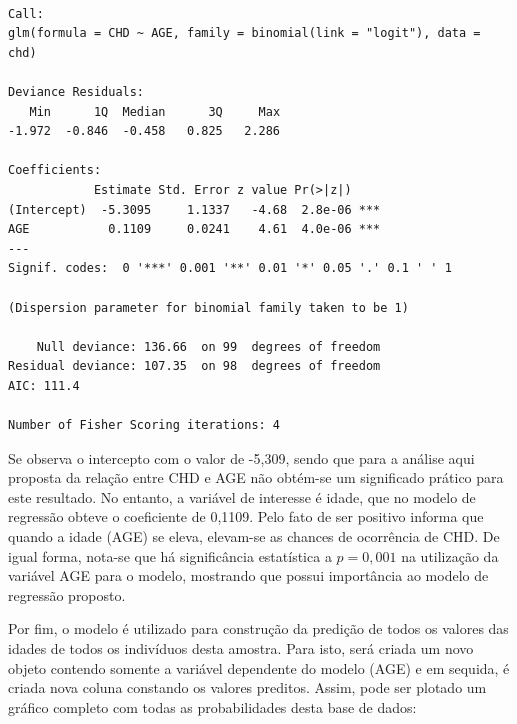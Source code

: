 \documentclass[12pt,brazil,oneside]{book}
\newenvironment{Shaded}{\begin{snugshade}}{\end{snugshade}}
\newcommand{\CommentTok}[1]{\textcolor[rgb]{0.56,0.35,0.01}{\textit{#1}}}
\newcommand{\DataTypeTok}[1]{\textcolor[rgb]{0.13,0.29,0.53}{#1}}
\newcommand{\DecValTok}[1]{\textcolor[rgb]{0.00,0.00,0.81}{#1}}
\newcommand{\KeywordTok}[1]{\textcolor[rgb]{0.13,0.29,0.53}{\textbf{#1}}}
\newcommand{\NormalTok}[1]{#1}
\newcommand{\OperatorTok}[1]{\textcolor[rgb]{0.81,0.36,0.00}{\textbf{#1}}}
\newcommand{\StringTok}[1]{\textcolor[rgb]{0.31,0.60,0.02}{#1}}
\begin{document}
\begin{verbatim}

Call:
glm(formula = CHD ~ AGE, family = binomial(link = "logit"), data = chd)

Deviance Residuals: 
   Min      1Q  Median      3Q     Max  
-1.972  -0.846  -0.458   0.825   2.286  

Coefficients:
            Estimate Std. Error z value Pr(>|z|)    
(Intercept)  -5.3095     1.1337   -4.68  2.8e-06 ***
AGE           0.1109     0.0241    4.61  4.0e-06 ***
---
Signif. codes:  0 '***' 0.001 '**' 0.01 '*' 0.05 '.' 0.1 ' ' 1

(Dispersion parameter for binomial family taken to be 1)

    Null deviance: 136.66  on 99  degrees of freedom
Residual deviance: 107.35  on 98  degrees of freedom
AIC: 111.4

Number of Fisher Scoring iterations: 4
\end{verbatim}

Se observa o intercepto com o valor de -5,309, sendo que para a análise aqui proposta da relação entre CHD e AGE não obtém-se um significado prático para este resultado. No entanto, a variável de interesse é idade, que no modelo de regressão obteve o coeficiente de 0,1109. Pelo fato de ser positivo informa que quando a idade (AGE) se eleva, elevam-se as chances de ocorrência de CHD. De igual forma, nota-se que há significância estatística a \(p=0,001\) na utilização da variável AGE para o modelo, mostrando que possui importância ao modelo de regressão proposto.

Por fim, o modelo é utilizado para construção da predição de todos os valores das idades de todos os indivíduos desta amostra. Para isto, será criada um novo objeto contendo somente a variável dependente do modelo (AGE) e em sequida, é criada nova coluna constando os valores preditos. Assim, pode ser plotado um gráfico completo com todas as probabilidades desta base de dados:

\begin{Shaded}
\end{Shaded}
\end{document}
